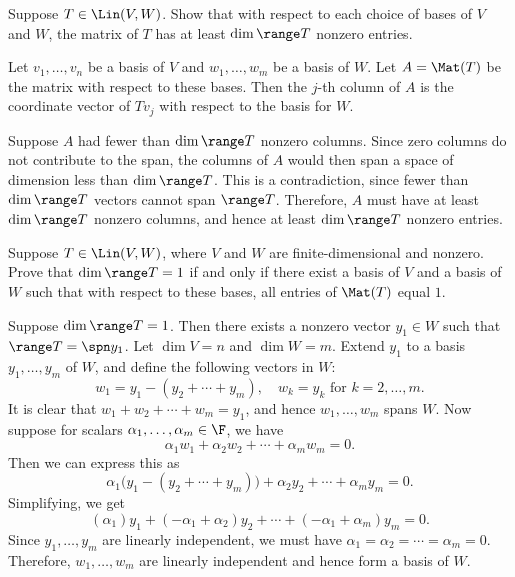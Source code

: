 \begin{exc}

\begin{exercise}
Suppose $T\in\Lin(V,W)$. Show that with respect to each choice of bases of $V$
and $W$, the matrix of $T$ has at least $\dim\range T$ nonzero entries.
\end{exercise}
\begin{solution}
Let $v_1,\dots,v_n$ be a basis of $V$ and $w_1,\dots,w_m$ be a basis of $W$.
Let $A=\Mat(T)$ be the matrix with respect to these bases. Then the $j$-th
column of $A$ is the coordinate vector of $Tv_j$ with respect to the basis for
$W$.

Suppose $A$ had fewer than $\dim\range T$ nonzero columns. Since zero columns
do not contribute to the span, the columns of $A$ would then span a space of
dimension less than $\dim\range T$. This is a contradiction, since fewer than
$\dim\range T$ vectors cannot span $\range T$. Therefore, $A$ must have at
least $\dim\range T$ nonzero columns, and hence at least $\dim\range T$ nonzero
entries.
\end{solution}

\begin{exercise}
Suppose $T\in\Lin(V,W)$, where $V$ and $W$ are finite-dimensional and nonzero.
Prove that $\dim\range T=1$ if and only if there exist a basis of $V$ and a
basis of $W$ such that with respect to these bases, all entries of $\Mat(T)$
equal $1$.
\end{exercise}
\begin{solution}
Suppose $\dim\range T=1$. Then there exists a nonzero vector $y_1\in W$ such
that $\range T=\spn y_1$. Let $\dim V=n$ and $\dim W=m$. Extend $y_1$ to a
basis $y_1,\dots,y_m$ of $W$, and define the following vectors in $W$:
\[ w_1 = y_1-(y_2+\cdots+y_m), \quad w_k = y_k \text{ for } k=2,\dots,m. \]
It is clear that $w_1+w_2+\cdots+w_m=y_1$, and hence $w_1,\dots,w_m$ spans $W$.
Now suppose for scalars $\alpha_1,\dots,\alpha_m\in\F$, we have
\[ \alpha_1w_1+\alpha_2w_2+\cdots+\alpha_mw_m = 0. \]
Then we can express this as
\[ \alpha_1\bigl(y_1-(y_2+\cdots+y_m)\bigr)+\alpha_2y_2+\cdots+\alpha_my_m = 0. \]
Simplifying, we get
\[ (\alpha_1)y_1+(-\alpha_1+\alpha_2)y_2+\cdots+(-\alpha_1+\alpha_m)y_m = 0. \]
Since $y_1,\dots,y_m$ are linearly independent, we must have
$\alpha_1=\alpha_2=\cdots=\alpha_m=0$. Therefore, $w_1,\dots,w_m$ are linearly
independent and hence form a basis of $W$.


\end{solution}
\end{exc}
